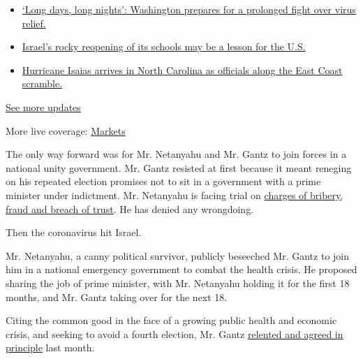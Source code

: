 \begin{itemize}
\tightlist
\item
  \href{https://www.nytimes3xbfgragh.onion/2020/08/04/world/coronavirus-covid-19.html?action=click\&pgtype=Article\&state=default\&region=MAIN_CONTENT_1\&context=storylines_live_updates\#link-6b644638}{`Long
  days, long nights': Washington prepares for a prolonged fight over
  virus relief.}
\item
  \href{https://www.nytimes3xbfgragh.onion/2020/08/04/world/coronavirus-covid-19.html?action=click\&pgtype=Article\&state=default\&region=MAIN_CONTENT_1\&context=storylines_live_updates\#link-7af9fca0}{Israel's
  rocky reopening of its schools may be a lesson for the U.S.}
\item
  \href{https://www.nytimes3xbfgragh.onion/2020/08/04/world/coronavirus-covid-19.html?action=click\&pgtype=Article\&state=default\&region=MAIN_CONTENT_1\&context=storylines_live_updates\#link-33bf9168}{Hurricane
  Isaias arrives in North Carolina as officials along the East Coast
  scramble.}
\end{itemize}

\href{https://www.nytimes3xbfgragh.onion/2020/08/04/world/coronavirus-covid-19.html?action=click\&pgtype=Article\&state=default\&region=MAIN_CONTENT_1\&context=storylines_live_updates}{See
more updates}

More live coverage:
\href{https://www.nytimes3xbfgragh.onion/live/2020/08/04/business/stock-market-today-coronavirus?action=click\&pgtype=Article\&state=default\&region=MAIN_CONTENT_1\&context=storylines_live_updates}{Markets}

The only way forward was for Mr. Netanyahu and Mr. Gantz to join forces
in a national unity government. Mr. Gantz resisted at first because it
meant reneging on his repeated election promises not to sit in a
government with a prime minister under indictment. Mr. Netanyahu is
facing trial on
\href{https://www.nytimes3xbfgragh.onion/2019/11/21/world/middleeast/netanyahu-corruption-indicted.html}{charges
of bribery, fraud and breach of trust}. He has denied any wrongdoing.

Then the coronavirus hit Israel.

Mr. Netanyahu, a canny political survivor, publicly beseeched Mr. Gantz
to join him in a national emergency government to combat the health
crisis. He proposed sharing the job of prime minister, with Mr.
Netanyahu holding it for the first 18 months, and Mr. Gantz taking over
for the next 18.

Citing the common good in the face of a growing public health and
economic crisis, and seeking to avoid a fourth election, Mr. Gantz
\href{https://www.nytimes3xbfgragh.onion/2020/03/26/world/middleeast/israel-netanyahu-gantz-government.html}{relented
and agreed in principle} last month.

